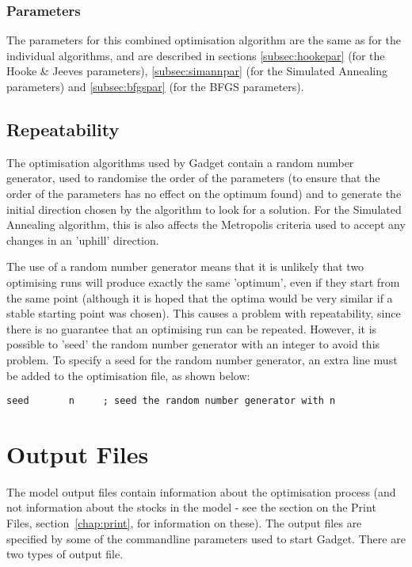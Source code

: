 \documentclass[10pt,twoside]{book}
\begin{document}
\subsection{Parameters}\label{subsec:combinepar}
The parameters for this combined optimisation algorithm are the same as for the individual algorithms, and are described in sections \ref{subsec:hookepar} (for the Hooke \& Jeeves parameters), \ref{subsec:simannpar} (for the Simulated Annealing parameters) and \ref{subsec:bfgspar} (for the BFGS parameters).

\section{Repeatability}\label{sec:repeat}
The optimisation algorithms used by Gadget contain a random number generator, used to randomise the order of the parameters (to ensure that the order of the parameters has no effect on the optimum found) and to generate the initial direction chosen by the algorithm to look for a solution.  For the Simulated Annealing algorithm, this is also affects the Metropolis criteria used to accept any changes in an 'uphill' direction.

\bigskip
The use of a random number generator means that it is unlikely that two optimising runs will produce exactly the same 'optimum', even if they start from the same point (although it is hoped that the optima would be very similar if a stable starting point was chosen).  This causes a problem with repeatability, since there is no guarantee that an optimising run can be repeated.  However, it is possible to 'seed' the random number generator with an integer to avoid this problem.  To specify a seed for the random number generator, an extra line must be added to the optimisation file, as shown below:

{\small\begin{verbatim}
seed       n     ; seed the random number generator with n
\end{verbatim}}

\chapter{Output Files}\label{chap:output}
The model output files contain information about the optimisation process (and not information about the stocks in the model - see the section on the Print Files, section~\ref{chap:print}, for information on these).  The output files are specified by some of the commandline parameters used to start Gadget.  There are two types of output file.
\end{document}
